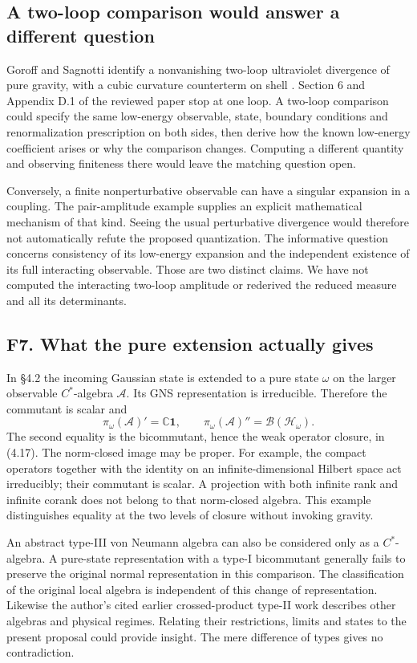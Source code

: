\documentclass[11pt]{article}
\newcommand{\id}{\mathbf{1}}
\begin{document}
\subsection{A two-loop comparison would answer a different question}
Goroff and Sagnotti identify a nonvanishing two-loop ultraviolet divergence of pure gravity, with a cubic curvature counterterm on shell \cite{gs}. Section 6 and Appendix D.1 of the reviewed paper stop at one loop. A two-loop comparison could specify the same low-energy observable, state, boundary conditions and renormalization prescription on both sides, then derive how the known low-energy coefficient arises or why the comparison changes. Computing a different quantity and observing finiteness there would leave the matching question open.

Conversely, a finite nonperturbative observable can have a singular expansion in a coupling. The pair-amplitude example supplies an explicit mathematical mechanism of that kind. Seeing the usual perturbative divergence would therefore not automatically refute the proposed quantization. The informative question concerns consistency of its low-energy expansion and the independent existence of its full interacting observable. Those are two distinct claims. We have not computed the interacting two-loop amplitude or rederived the reduced measure and all its determinants.

\subsection{F7. What the pure extension actually gives}
In \S4.2 the incoming Gaussian state is extended to a pure state $\omega$ on the larger observable $C^*$-algebra $\mathcal A$. Its GNS representation is irreducible. Therefore the commutant is scalar and
\[
  \pi_\omega(\mathcal A)'=\mathbb C\id,\qquad
  \pi_\omega(\mathcal A)''=\mathcal B(\mathcal H_\omega).
\]
The second equality is the bicommutant, hence the weak operator closure, in (4.17). The norm-closed image may be proper. For example, the compact operators together with the identity on an infinite-dimensional Hilbert space act irreducibly; their commutant is scalar. A projection with both infinite rank and infinite corank does not belong to that norm-closed algebra. This example distinguishes equality at the two levels of closure without invoking gravity.

An abstract type-III von Neumann algebra can also be considered only as a $C^*$-algebra. A pure-state representation with a type-I bicommutant generally fails to preserve the original normal representation in this comparison. The classification of the original local algebra is independent of this change of representation. Likewise the author's cited earlier crossed-product type-II work describes other algebras and physical regimes. Relating their restrictions, limits and states to the present proposal could provide insight. The mere difference of types gives no contradiction.
\end{document}
